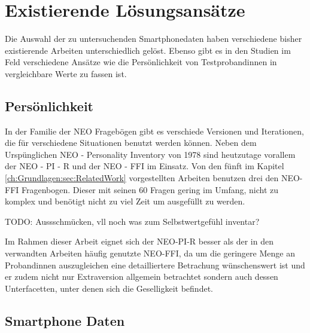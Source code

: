 \section{Existierende Lösungsansätze}
\label{ch:Analyse:sec:RelatedWork}

Die Auswahl der zu untersuchenden Smartphonedaten haben verschiedene bisher existierende Arbeiten unterschiedlich gelöst.
Ebenso gibt es in den Studien im Feld verschiedene Ansätze wie die Persönlichkeit von Testprobandinnen in vergleichbare Werte zu fassen ist.

\subsection{Persönlichkeit}

In der Familie der NEO Fragebögen gibt es verschiede Versionen und Iterationen, die für verschiedene Situationen benutzt werden können.
Neben dem Urspünglichen NEO - Personality Inventory von 1978 sind heutzutage vorallem der NEO - PI - R und der NEO - FFI im Einsatz.
Von den fünft im Kapitel \ref{ch:Grundlagen:sec:RelatedWork} vorgestellten Arbeiten benutzen drei den NEO-FFI Fragenbogen. 
Dieser mit seinen 60 Fragen gering im Umfang, nicht zu komplex und benötigt nicht zu viel Zeit um ausgefüllt zu werden.

\par
TODO: Aussschmücken, vll noch was zum Selbstwertgefühl inventar?

\par
Im Rahmen dieser Arbeit eignet sich der NEO-PI-R besser als der in den verwandten Arbeiten häufig genutzte NEO-FFI, 
da um die geringere Menge an Probandinnen auszugleichen eine detailliertere Betrachung wünschenswert ist und 
er zudem nicht nur Extraversion allgemein betrachtet sondern auch dessen Unterfacetten, unter denen sich die Geselligkeit befindet.

\subsection{Smartphone Daten}

